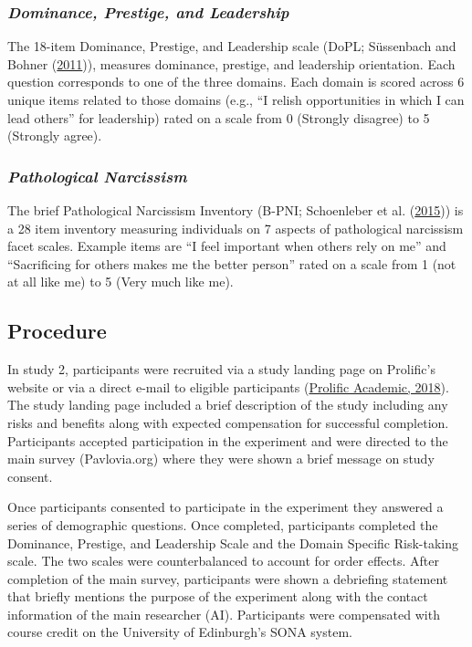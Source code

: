 \documentclass[
  donotrepeattitle,doc, 12pt, a4paper,floatsintext]{apa7}
\begin{document}
\hypertarget{dominance-prestige-and-leadership}{%
\subsubsection{\texorpdfstring{\emph{Dominance, Prestige, and Leadership}}{Dominance, Prestige, and Leadership}}\label{dominance-prestige-and-leadership}}

The 18-item Dominance, Prestige, and Leadership scale (DoPL; Süssenbach and Bohner (\protect\hyperlink{ref-sussenbach2011}{2011})), measures dominance, prestige, and leadership orientation. Each question corresponds to one of the three domains. Each domain is scored across 6 unique items related to those domains (e.g., ``I relish opportunities in which I can lead others'' for leadership) rated on a scale from 0 (Strongly disagree) to 5 (Strongly agree).

\hypertarget{pathological-narcissism}{%
\subsubsection{\texorpdfstring{\emph{Pathological Narcissism}}{Pathological Narcissism}}\label{pathological-narcissism}}

The brief Pathological Narcissism Inventory (B-PNI; Schoenleber et al. (\protect\hyperlink{ref-schoenleber2015}{2015})) is a 28 item inventory measuring individuals on 7 aspects of pathological narcissism facet scales. Example items are ``I feel important when others rely on me'' and ``Sacrificing for others makes me the better person'' rated on a scale from 1 (not at all like me) to 5 (Very much like me).

\hypertarget{procedure-5}{%
\subsection{Procedure}\label{procedure-5}}

In study 2, participants were recruited via a study landing page on Prolific's website or via a direct e-mail to eligible participants (\protect\hyperlink{ref-prolificacademic2018}{Prolific Academic, 2018}). The study landing page included a brief description of the study including any risks and benefits along with expected compensation for successful completion. Participants accepted participation in the experiment and were directed to the main survey (Pavlovia.org) where they were shown a brief message on study consent.

Once participants consented to participate in the experiment they answered a series of demographic questions. Once completed, participants completed the Dominance, Prestige, and Leadership Scale and the Domain Specific Risk-taking scale. The two scales were counterbalanced to account for order effects. After completion of the main survey, participants were shown a debriefing statement that briefly mentions the purpose of the experiment along with the contact information of the main researcher (AI). Participants were compensated with course credit on the University of Edinburgh's SONA system.
\end{document}
